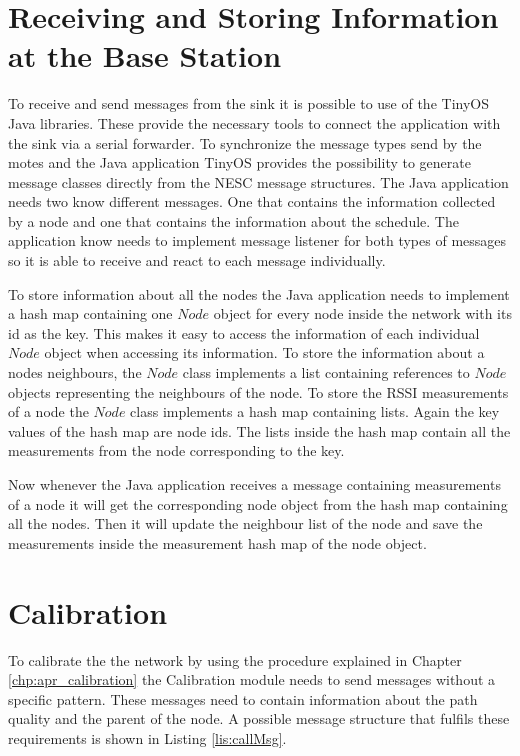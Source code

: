 \section{Receiving and Storing Information at the Base Station}
\label{chp:imp_baseStation}
To receive and send messages from the sink it is possible to use of the TinyOS Java libraries. These provide the necessary tools to connect the application with the sink via a serial forwarder. To synchronize the message types send by the motes and the Java application TinyOS provides the possibility to generate message classes directly from the NESC message structures. The Java application needs two know different messages. One that contains the information collected by a node and one that contains the information about the schedule. The application know needs to implement message listener for both types of messages so it is able to receive and react to each message individually.

To store information about all the nodes the Java application needs to implement a hash map containing one $Node$ object for every node inside the network with its id as the key. This makes it easy to access the information of each individual $Node$ object when accessing its information. To store the information about a nodes neighbours, the $Node$ class implements a list containing references to $Node$ objects representing the neighbours of the node. To store the RSSI measurements of a node the $Node$ class implements a hash map containing lists. Again the key values of the hash map are node ids. The lists inside the hash map contain all the measurements from the node corresponding to the key. 

Now whenever the Java application receives a message containing measurements of a node it will get the corresponding node object from the hash map containing all the nodes. Then it will update the neighbour list of the node and save the measurements inside the measurement hash map of the node object.
\section{Calibration}
\label{chp:imp_calibration}
To calibrate the the network by using the procedure explained in Chapter \ref{chp:apr_calibration} the Calibration module needs to send messages without a specific pattern. These messages need to contain information about the path quality and the parent of the node. A possible message structure that fulfils these requirements is shown in Listing \ref{lis:callMsg}. 

